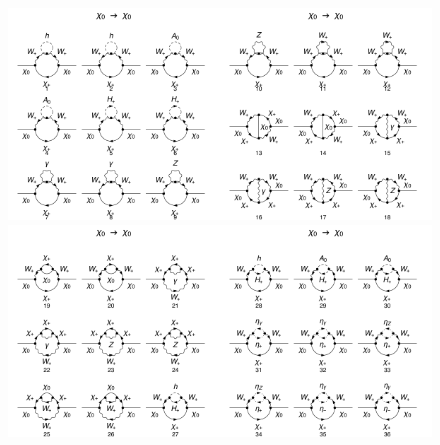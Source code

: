 \documentclass[11pt]{article}
\begin{document}
\begin{figure}[h!]
\center
\includegraphics[width=0.5\textwidth]{diagrams_F[2]_2_1.pdf}\includegraphics[width=0.5\textwidth]{diagrams_F[2]_2_2.pdf}
\includegraphics[width=0.5\textwidth]{diagrams_F[2]_2_3.pdf}\includegraphics[width=0.5\textwidth]{diagrams_F[2]_2_4.pdf}

\end{figure}
\end{document}
